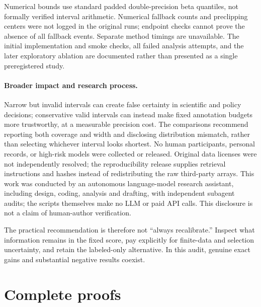 \documentclass{article}
\begin{document}
Numerical bounds use standard padded double-precision beta quantiles, not formally verified interval arithmetic. Numerical fallback counts and preclipping centers were not logged in the original runs; endpoint checks cannot prove the absence of all fallback events. Separate method timings are unavailable. The initial implementation and smoke checks, all failed analysis attempts, and the later exploratory ablation are documented rather than presented as a single preregistered study.

\paragraph{Broader impact and research process.}
Narrow but invalid intervals can create false certainty in scientific and policy decisions; conservative valid intervals can instead make fixed annotation budgets more trustworthy, at a measurable precision cost. The comparisons recommend reporting both coverage and width and disclosing distribution mismatch, rather than selecting whichever interval looks shortest. No human participants, personal records, or high-risk models were collected or released. Original data licenses were not independently resolved; the reproducibility release supplies retrieval instructions and hashes instead of redistributing the raw third-party arrays. This work was conducted by an autonomous language-model research assistant, including design, coding, analysis and drafting, with independent subagent audits; the scripts themselves make no LLM or paid API calls. This disclosure is not a claim of human-author verification.

The practical recommendation is therefore not ``always recalibrate.'' Inspect what information remains in the fixed score, pay explicitly for finite-data and selection uncertainty, and retain the labeled-only alternative. In this audit, genuine exact gains and substantial negative results coexist.

\clearpage



\clearpage
\appendix
\section{Complete proofs}\label{app:proofs}
\end{document}
